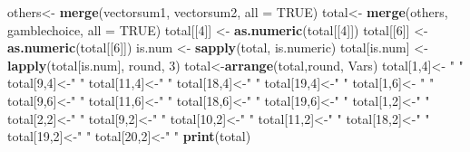 \documentclass[]{article}
\newenvironment{Shaded}{\begin{snugshade}}{\end{snugshade}}
\newcommand{\KeywordTok}[1]{\textcolor[rgb]{0.13,0.29,0.53}{\textbf{#1}}}
\newcommand{\DataTypeTok}[1]{\textcolor[rgb]{0.13,0.29,0.53}{#1}}
\newcommand{\DecValTok}[1]{\textcolor[rgb]{0.00,0.00,0.81}{#1}}
\newcommand{\StringTok}[1]{\textcolor[rgb]{0.31,0.60,0.02}{#1}}
\newcommand{\OtherTok}[1]{\textcolor[rgb]{0.56,0.35,0.01}{#1}}
\newcommand{\NormalTok}[1]{#1}
\begin{document}
\begin{Shaded}
\begin{Highlighting}[]
\NormalTok{others<-}\StringTok{ }\KeywordTok{merge}\NormalTok{(vectorsum1, vectorsum2, }\DataTypeTok{all =} \OtherTok{TRUE}\NormalTok{)}
\NormalTok{total<-}\StringTok{ }\KeywordTok{merge}\NormalTok{(others, gamblechoice, }\DataTypeTok{all =} \OtherTok{TRUE}\NormalTok{)}
\NormalTok{total[[}\DecValTok{4}\NormalTok{]] <-}\StringTok{ }\KeywordTok{as.numeric}\NormalTok{(total[[}\DecValTok{4}\NormalTok{]])}
\NormalTok{total[[}\DecValTok{6}\NormalTok{]] <-}\StringTok{ }\KeywordTok{as.numeric}\NormalTok{(total[[}\DecValTok{6}\NormalTok{]])}
\NormalTok{is.num <-}\StringTok{ }\KeywordTok{sapply}\NormalTok{(total, is.numeric)}
\NormalTok{total[is.num] <-}\StringTok{ }\KeywordTok{lapply}\NormalTok{(total[is.num], round, }\DecValTok{3}\NormalTok{)}
\NormalTok{total<-}\KeywordTok{arrange}\NormalTok{(total,round, Vars)}
\NormalTok{total[}\DecValTok{1}\NormalTok{,}\DecValTok{4}\NormalTok{]<-}\StringTok{ " "}
\NormalTok{total[}\DecValTok{9}\NormalTok{,}\DecValTok{4}\NormalTok{]<-}\StringTok{" "}
\NormalTok{total[}\DecValTok{11}\NormalTok{,}\DecValTok{4}\NormalTok{]<-}\StringTok{" "}
\NormalTok{total[}\DecValTok{18}\NormalTok{,}\DecValTok{4}\NormalTok{]<-}\StringTok{" "}
\NormalTok{total[}\DecValTok{19}\NormalTok{,}\DecValTok{4}\NormalTok{]<-}\StringTok{" "}
\NormalTok{total[}\DecValTok{1}\NormalTok{,}\DecValTok{6}\NormalTok{]<-}\StringTok{ " "}
\NormalTok{total[}\DecValTok{9}\NormalTok{,}\DecValTok{6}\NormalTok{]<-}\StringTok{" "}
\NormalTok{total[}\DecValTok{11}\NormalTok{,}\DecValTok{6}\NormalTok{]<-}\StringTok{" "}
\NormalTok{total[}\DecValTok{18}\NormalTok{,}\DecValTok{6}\NormalTok{]<-}\StringTok{" "}
\NormalTok{total[}\DecValTok{19}\NormalTok{,}\DecValTok{6}\NormalTok{]<-}\StringTok{" "}
\NormalTok{total[}\DecValTok{1}\NormalTok{,}\DecValTok{2}\NormalTok{]<-}\StringTok{" "}
\NormalTok{total[}\DecValTok{2}\NormalTok{,}\DecValTok{2}\NormalTok{]<-}\StringTok{" "}
\NormalTok{total[}\DecValTok{9}\NormalTok{,}\DecValTok{2}\NormalTok{]<-}\StringTok{" "}
\NormalTok{total[}\DecValTok{10}\NormalTok{,}\DecValTok{2}\NormalTok{]<-}\StringTok{" "}
\NormalTok{total[}\DecValTok{11}\NormalTok{,}\DecValTok{2}\NormalTok{]<-}\StringTok{" "}
\NormalTok{total[}\DecValTok{18}\NormalTok{,}\DecValTok{2}\NormalTok{]<-}\StringTok{" "}
\NormalTok{total[}\DecValTok{19}\NormalTok{,}\DecValTok{2}\NormalTok{]<-}\StringTok{" "}
\NormalTok{total[}\DecValTok{20}\NormalTok{,}\DecValTok{2}\NormalTok{]<-}\StringTok{" "}
\KeywordTok{print}\NormalTok{(total)}
\end{Highlighting}
\end{Shaded}
\end{document}
